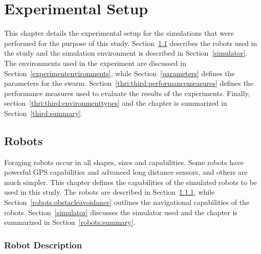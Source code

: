 
\chapter{Experimental Setup}
\label{chap:third}


This chapter details the experimental setup for the simulations that were performed for the purpose of this study. Section~\ref{chap:robots} describes the robots used in the study and the simulation environment is described in Section~\ref{simulator}. The environments used in the experiment are discussed in Section~\ref{experimentenvironments}, while Section~\ref{parameters} defines the parameters for the swarm. Section~\ref{thri:third:performancemeasures} defines the performance measures used to evaluate the results of the experiments. Finally, section~\ref{thri:third:environmenttypes} and the chapter is summarized in Section~\ref{third:summary}.


\section{Robots}
\label{chap:robots}

Foraging robots occur in all shapes, sizes and capabilities. Some robots have powerful GPS capabilities and advanced long distance sensors, and others are much simpler. This chapter defines the capabilities of the simulated robots to be used in this study. The robots are described in Section~\ref{robotdescription}, while Section~\ref{robots:obstacleavoidance} outlines the navigational capabilities of the robots. Section~\ref{simulator} discusses the simulator used and the chapter is summarized in Section~\ref{robots:summary}.

\subsection{Robot Description}
\label{robotdescription}

